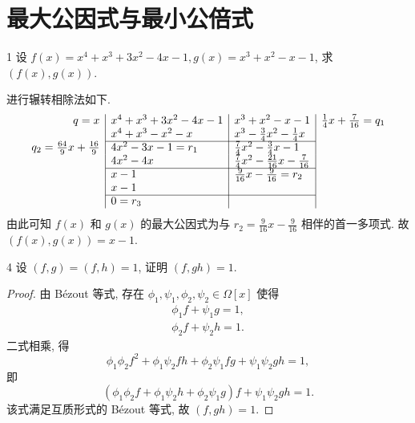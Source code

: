 
\renewcommand{\thesection}{1.4}

\section{最大公因式与最小公倍式}\label{sec:1.4}

\begin{ex}{1}\label{ex:1.4.1}
    设 \(f(x)=x^4+x^3+3x^2-4x-1,g(x)=x^3+x^2-x-1\), 求 \((f(x),g(x))\).
\end{ex}

\begin{solution}
    进行辗转相除法如下.
    \[
    \begin{array}{r | l | l | l}
        q=x & x^4+x^3+3x^2-4x-1 & x^3+x^2-x-1 & \frac{1}{4}x+\frac{7}{16}=q_1 \\
        & x^4+x^3-x^2-x & x^3-\frac{3}{4}x^2-\frac{1}{4}x & \\
        \cline{2-3}
        q_2=\frac{64}{9}x+\frac{16}{9} & 4x^2-3x-1=r_1 & \frac{7}{4}x^2-\frac{3}{4}x-1 & \\
        & 4x^2-4x & \frac{7}{4}x^2-\frac{21}{16}x-\frac{7}{16} & \\
        \cline{2-3}
        & x-1 & \frac{9}{16}x-\frac{9}{16}=r_2 & \\
        & x-1 & & \\
        \cline{2-3}
        & 0=r_3 & &
    \end{array}
    \]
    由此可知 \(f(x)\) 和 \(g(x)\) 的最大公因式为与 \(r_2=\frac{9}{16}x-\frac{9}{16}\) 相伴的首一多项式.
    故 \((f(x),g(x))=x-1\).
\end{solution}

\begin{ex}{4}\label{ex:1.4.4}
    设 \((f,g)=(f,h)=1\), 证明 \((f,gh)=1\).
\end{ex}

\begin{proof}
    由 B\'ezout 等式, 存在 \(\phi_1,\psi_1,\phi_2,\psi_2\in\Omega[x]\) 使得
    \begin{gather*}
        \phi_1f+\psi_1g=1,\\
        \phi_2f+\psi_2h=1.
    \end{gather*}
    二式相乘, 得
    \[
    \phi_1\phi_2f^2+\phi_1\psi_2fh+\phi_2\psi_1fg+\psi_1\psi_2gh=1,
    \]
    即
    \[
    (\phi_1\phi_2f+\phi_1\psi_2h+\phi_2\psi_1g)f+\psi_1\psi_2gh=1.
    \]
    该式满足互质形式的 B\'ezout 等式, 故 \((f,gh)=1\).
\end{proof}

